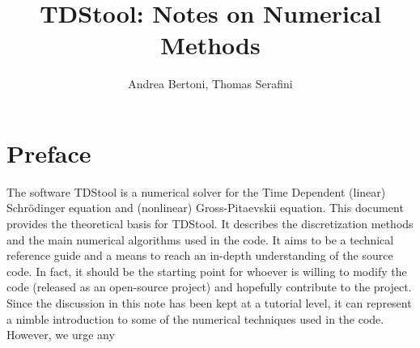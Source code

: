 \documentclass[a4paper,11pt]{article}
\title{TDStool: Notes on Numerical Methods}
\author{Andrea Bertoni, Thomas Serafini}
\begin{document}
\begin{titlepage}



\vspace{40mm}

\vspace{20mm}

\vspace{60mm}

\vspace{10mm}

\normalsize

\newpage
\pagestyle{empty}
\mbox{}
\end{titlepage}

\section*{Preface}
The software TDStool is a numerical solver for the Time Dependent (linear)
Schr\"odinger equation and (nonlinear) Gross-Pitaevskii equation.
This document provides the theoretical basis for TDStool.
It describes the discretization methods and the main numerical
algorithms used in the code. It aims to be a technical reference guide
and a means to reach an in-depth understanding of the source code.
In fact, it should be the starting point for whoever is willing to
modify the code (released as an open-source project) and hopefully contribute
to the project.
Since the discussion in this note has been kept at a tutorial level, 
it can represent a nimble introduction to some of the numerical techniques
used in the code. However, we urge any 
\end{document}
